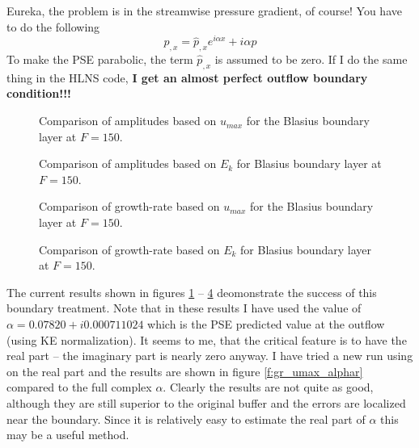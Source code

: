 \documentclass[12pt]{article}
\begin{document}
Eureka, the problem is in the streamwise pressure gradient, of course!  You
have to do the following
%
\begin{equation}
  p_{,x} = \hat p_{,x} e^{i\alpha x} + i\alpha p
\end{equation}
%
To make the PSE parabolic, the term $\hat p_{,x}$ is assumed to be zero.  If I
do the same thing in the HLNS code, {\bf I get an almost perfect outflow
boundary condition!!!}

\begin{figure}
\centering \epsfxsize=4.5in 
\caption {Comparison of amplitudes based on $u_{max}$ for the Blasius
boundary layer at $F=150$. \label{f:umax}}
\end{figure}

\begin{figure}
\centering \epsfxsize=4.5in 
\caption {Comparison of amplitudes based on $E_k$ for Blasius
boundary layer at $F=150$. \label{f:ke}}
\end{figure}

\begin{figure}
\centering \epsfxsize=4.5in 
\setvlabel{$\gamma$}
\caption {Comparison of growth-rate based on $u_{max}$ for the Blasius
boundary layer at $F=150$. \label{f:gr_umax}}
\end{figure}

\begin{figure}
\centering \epsfxsize=4.5in 
\setvlabel{$\gamma$}
\caption {Comparison of growth-rate based on $E_k$ for Blasius
boundary layer at $F=150$. \label{f:gr_ke}}
\end{figure}

The current results shown in figures \ref{f:umax} -- \ref{f:gr_ke}
deomonstrate the success of this boundary treatment.  Note that in these
results I have used the value of $\alpha = 0.07820 + i 0.000711024$ which is
the PSE predicted value at the outflow (using KE normalization).  It seems to
me, that the critical feature is to have the real part -- the imaginary part
is nearly zero anyway.  I have tried a new run using on the real part and the
results are shown in figure \ref{f:gr_umax_alphar} compared to the full
complex $\alpha$.  Clearly the results are not quite as good, although they
are still superior to the original buffer and the errors are localized near
the boundary.  Since it is relatively easy to estimate the real part of
$\alpha$ this may be a useful method.
\end{document}
